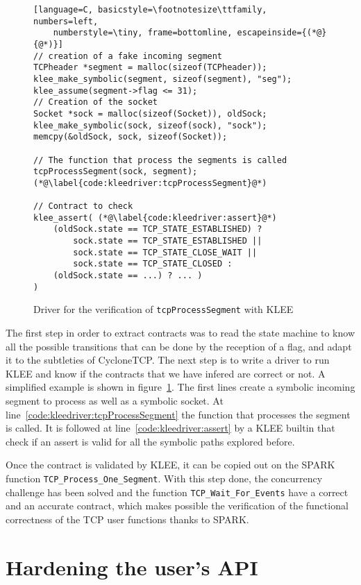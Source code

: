 \documentclass[conference]{IEEEtran}
\def\spark#1{\lstinline[language=Ada]{#1}}
\begin{document}
\begin{figure}
\begin{lstlisting}[language=C, basicstyle=\footnotesize\ttfamily, numbers=left,
    numberstyle=\tiny, frame=bottomline, escapeinside={(*@}{@*)}]
// creation of a fake incoming segment
TCPheader *segment = malloc(sizeof(TCPheader));
klee_make_symbolic(segment, sizeof(segment), "seg");
klee_assume(segment->flag <= 31);
// Creation of the socket
Socket *sock = malloc(sizeof(Socket)), oldSock;
klee_make_symbolic(sock, sizeof(sock), "sock");
memcpy(&oldSock, sock, sizeof(Socket));

// The function that process the segments is called
tcpProcessSegment(sock, segment); (*@\label{code:kleedriver:tcpProcessSegment}@*)

// Contract to check
klee_assert( (*@\label{code:kleedriver:assert}@*)
    (oldSock.state == TCP_STATE_ESTABLISHED) ?
        sock.state == TCP_STATE_ESTABLISHED ||
        sock.state == TCP_STATE_CLOSE_WAIT ||
        sock.state == TCP_STATE_CLOSED :
    (oldSock.state == ...) ? ... )
)
\end{lstlisting}
\caption{Driver for the verification of \lstinline[language=C]{tcpProcessSegment}
with KLEE}
\label{code:kleedriver}
\end{figure}

The first step in order to extract contracts was to read the state machine to
know all the possible transitions that can be done by the reception of a flag,
and adapt it to
the subtleties of CycloneTCP. The next step is to write a driver to run KLEE and
know if the contracts that we have infered are correct or not.
A simplified example is shown in figure~\ref{code:kleedriver}. The first lines
create a symbolic incoming segment to process as well as a symbolic socket.
At line~\ref{code:kleedriver:tcpProcessSegment} the function that processes the
segment is called. It is followed at line~\ref{code:kleedriver:assert} by a KLEE
builtin that check if an assert is valid for all the symbolic paths
explored before.

Once the contract is validated by KLEE, it can be copied out on the SPARK
function \spark{TCP_Process_One_Segment}. With this step done, the concurrency
challenge has been solved and the function
\spark{TCP_Wait_For_Events} have a correct and an accurate contract, which
makes possible the verification of the functional correctness of the TCP user
functions thanks to SPARK.



\section{Hardening the user's API}
\label{sec:API}
\end{document}
